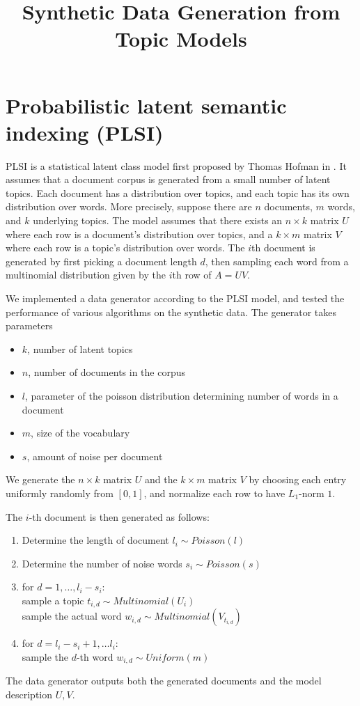 \documentclass[11pt]{article}
\title{Synthetic Data Generation from Topic Models }
\author{}
\date{}                                           %
\theoremstyle{definition}
\begin{document}
\maketitle
\section{Probabilistic latent semantic indexing (PLSI)}
PLSI is a statistical latent class model first proposed by Thomas Hofman in \cite{?}. It assumes that a document corpus is generated from a small number of latent topics. Each document has a distribution over topics, and each topic has its own distribution over words. More precisely, suppose there are $n$ documents, $m$ words, and $k$ underlying topics. The model assumes that there exists an $n\times k$ matrix $U$ where each row is a document's distribution over topics, and a $k\times m$ matrix $V$ where each row is a topic's distribution over words. The $i$th document is generated by first picking a document length $d$, then sampling each word from a multinomial distribution given by the $i$th row of $A=UV$. 

We implemented a data generator according to the PLSI model, and tested the performance of various algorithms on the synthetic data. The generator takes parameters
\begin{itemize}
	\item $k$, number of latent topics
	\item $n$, number of documents in the corpus
	\item $l$, parameter of the poisson distribution determining number of words in a document
	\item $m$, size of the vocabulary
	\item $s$, amount of noise per document
\end{itemize}
We generate the $n\times k$ matrix $U$ and the $k\times m$ matrix $V$ by choosing each entry uniformly randomly from $[0,1]$, and normalize each row to have $L_1$-norm $1$.

The $i$-th document is then generated as follows:
\begin{enumerate}
	\item Determine the length of document $l_i\sim Poisson(l)$
	\item Determine the number of noise words $s_i\sim Poisson(s)$
	\item for $d=1,\ldots,l_i-s_i$:\\
				\hspace*{5 mm} sample a topic $t_{i,d}\sim Multinomial(U_i)$\\
				\hspace*{5 mm} sample the actual word $w_{i,d}\sim Multinomial(V_{t_{i,d}})$
	\item for $d=l_i-s_i+1,\ldots l_i$:\\
				\hspace*{5 mm} sample the $d$-th word $w_{i,d}\sim Uniform(m)$ 
\end{enumerate}
The data generator outputs both the generated documents and the model description $U,V$.
\end{document}
